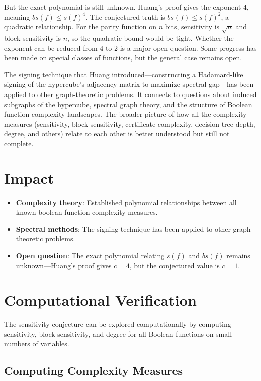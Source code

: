 But the exact polynomial is still unknown. Huang's proof gives the exponent 4, meaning $bs(f) \le s(f)^4$. The conjectured truth is $bs(f) \le s(f)^2$, a quadratic relationship. For the parity function on $n$ bits, sensitivity is $\sqrt{n}$ and block sensitivity is $n$, so the quadratic bound would be tight. Whether the exponent can be reduced from 4 to 2 is a major open question. Some progress has been made on special classes of functions, but the general case remains open.

The signing technique that Huang introduced---constructing a Hadamard-like signing of the hypercube's adjacency matrix to maximize spectral gap---has been applied to other graph-theoretic problems. It connects to questions about induced subgraphs of the hypercube, spectral graph theory, and the structure of Boolean function complexity landscapes. The broader picture of how all the complexity measures (sensitivity, block sensitivity, certificate complexity, decision tree depth, degree, and others) relate to each other is better understood but still not complete.

\section{Impact}
\begin{itemize}
\item \textbf{Complexity theory}: Established polynomial relationships between all known boolean function complexity measures.
\item \textbf{Spectral methods}: The signing technique has been applied to other graph-theoretic problems.
\item \textbf{Open question}: The exact polynomial relating $s(f)$ and $bs(f)$ remains unknown---Huang's proof gives $c = 4$, but the conjectured value is $c = 1$.
\end{itemize}

\section{Computational Verification}

The sensitivity conjecture can be explored computationally by computing sensitivity, block sensitivity, and degree for all Boolean functions on small numbers of variables.

\subsection{Computing Complexity Measures}

